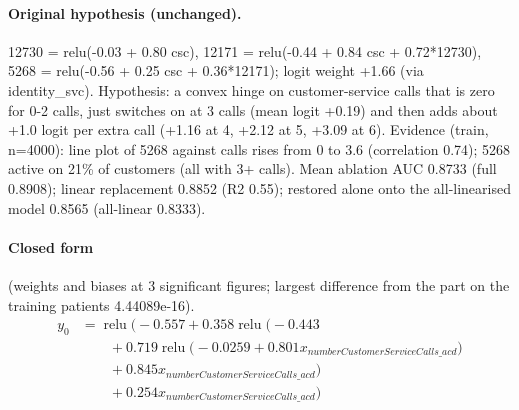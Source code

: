 \documentclass[a4paper,10pt]{article}
\newif\ifreviewmarks
\newcommand{\reviewrule}{\noindent{\color{BrickRed}\rule{\linewidth}{0.8pt}}}
\newenvironment{drafted}[1][]{%
  \ifreviewmarks\par\addvspace{\medskipamount}\reviewrule\par\nopagebreak
  \noindent{\color{BrickRed}\sffamily\footnotesize\textbf{Thesis Draft}\quad #1\hfill review}\par\nopagebreak\smallskip\fi}{%
  \ifreviewmarks\par\smallskip\noindent{\color{BrickRed}\sffamily\footnotesize end of thesis draft}\par\nopagebreak\reviewrule\par\medskip\fi}
\begin{document}
\begin{drafted}[plain-language layer: churn100-s4-c2]
\paragraph{Original hypothesis (unchanged).} 12730 = relu(-0.03 + 0.80 csc), 12171 = relu(-0.44 + 0.84 csc + 0.72*12730), 5268 = relu(-0.56 + 0.25 csc + 0.36*12171); logit weight +1.66 (via identity\_\allowbreak{}svc). Hypothesis: a convex hinge on customer-service calls that is zero for 0-2 calls, just switches on at 3 calls (mean logit +0.19) and then adds about +1.0 logit per extra call (+1.16 at 4, +2.12 at 5, +3.09 at 6). Evidence (train, n=4000): line plot of 5268 against calls rises from 0 to 3.6 (correlation 0.74); 5268 active on 21\% of customers (all with 3+ calls). Mean ablation AUC 0.8733 (full 0.8908); linear replacement 0.8852 (R2 0.55); restored alone onto the all-linearised model 0.8565 (all-linear 0.8333).
\paragraph{Closed form} {\footnotesize(weights and biases at 3 significant figures; largest difference from the part on the training patients 4.44089e-16).}
{\small\begingroup\allowdisplaybreaks
\begin{align*}
y_{0} &= \operatorname{relu}\bigl(-0.557 + 0.358 \operatorname{relu}\bigl(-0.443 \\
&\qquad + 0.719 \operatorname{relu}\bigl(-0.0259 + 0.801 x_{numberCustomerServiceCalls\_acd}\bigr) \\
&\qquad + 0.845 x_{numberCustomerServiceCalls\_acd}\bigr) \\
&\qquad + 0.254 x_{numberCustomerServiceCalls\_acd}\bigr)
\end{align*}\endgroup}


\end{drafted}
\end{document}
